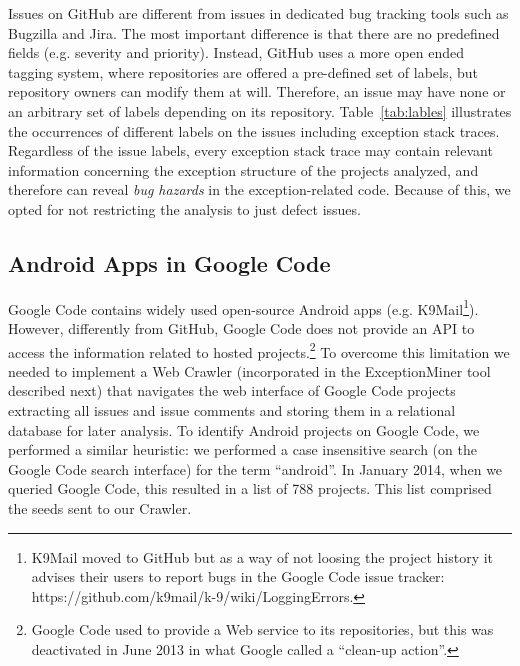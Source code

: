 Issues on GitHub are different from issues in dedicated bug tracking tools such as 
Bugzilla and Jira. The most important difference is that there are no predefined fields
  (e.g. severity and priority). Instead, GitHub uses a more open ended tagging system, where
repositories are offered a pre-defined set of labels, but repository owners can modify 
them at will. Therefore, an issue may have none or an arbitrary set of labels depending 
on its repository. Table~\ref{tab:lables} illustrates the occurrences of different labels 
on the issues including exception stack traces. Regardless of the issue labels, every exception stack
trace may contain relevant information concerning the exception structure of the
projects analyzed, and therefore can reveal \emph{bug hazards} in the exception-related code.
Because of this, we opted for not restricting the analysis to just defect issues.


\subsection{Android Apps in Google Code}
Google Code contains widely used open-source Android apps (e.g. K9Mail\footnote{K9Mail moved to GitHub but as a way of not loosing the project history it advises their users to report bugs in the Google Code issue tracker: https://github.com/k9mail/k-9/wiki/LoggingErrors.}).
However, differently from GitHub, Google Code does not provide an API to access the information related
 to hosted projects.\footnote{Google Code used to provide a Web service to its repositories, but this was deactivated in June 2013 in what Google called a ``clean-up action''.}
To overcome this limitation we needed to implement a Web Crawler (incorporated in the ExceptionMiner tool described next) that navigates 
 the web interface of Google Code projects extracting all issues and issue comments and storing them in a relational database for later analysis.
To identify Android projects on Google Code, we performed a similar heuristic: we performed a case insensitive search 
(on the Google Code search interface) for the term ``android''. In January 2014, when we queried Google Code, this resulted in a list of 788  projects. This list comprised the seeds sent to our Crawler.

